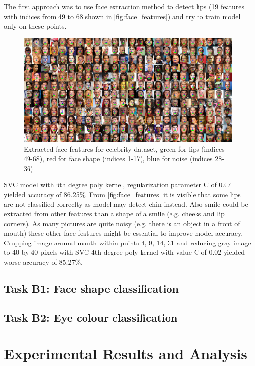 \documentclass[a4paper,11pt]{article}
\begin{document}
The first approach was to use face extraction method to detect lips (19 features with indices from 49 to 68 shown in \autoref{fig:face_features}) and try to train model only on these points. 
\begin{figure}[h]
	\centering
	\includegraphics[width=\linewidth]{face_features2.png}
	\caption{Extracted face features for celebrity dataset, green for lips (indices 49-68), red for face shape (indices 1-17), blue for noise (indices 28-36)}
	\label{fig:face_features}	
\end{figure}
SVC model with 6th degree poly kernel, regularization parameter C of 0.07 yielded accuracy of 86.25\%. From \autoref{fig:face_features} it is visible that some lips are not classified correclty as model may detect chin instead. Also smile could be extracted from other features than a shape of a smile (e.g. cheeks and lip corners). As many pictures are quite noisy (e.g. there is an object in a front of mouth) these other face features might be essential to improve model accuracy. Cropping image around mouth within points 4, 9, 14, 31 and reducing gray image to 40 by 40 pixels with SVC 4th degree poly kernel with value C of 0.02 yielded worse accuracy of 85.27\%.

\subsection{Task B1: Face shape classification}
\subsection{Task B2: Eye colour classification}
\section{Experimental Results and Analysis}

\end{document}

